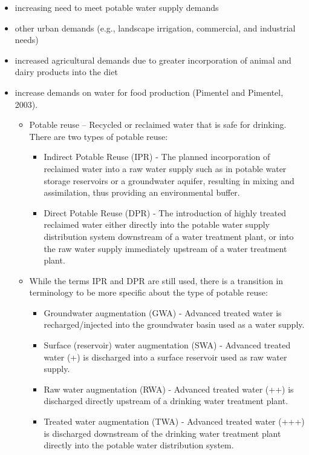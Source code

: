 \begin{itemize}
\item increasing need to meet potable water supply demands
\item other urban demands (e.g., landscape irrigation, commercial, and industrial needs)
\item increased agricultural demands due to greater incorporation of animal and dairy products into the diet
\item increase demands on water for food production (Pimentel and Pimentel, 2003). 
\begin{itemize}
\item Potable reuse – Recycled or reclaimed water that is safe for drinking.  There are two types of potable reuse:
\begin{itemize}
\item Indirect Potable Reuse (IPR) - The planned incorporation of reclaimed water into a raw water supply such as in potable water storage reservoirs or a groundwater aquifer, resulting in mixing and assimilation, thus providing an environmental buffer.
\item Direct Potable Reuse (DPR) - The introduction of highly treated reclaimed water either directly into the potable water supply distribution system downstream of a water treatment plant, or into the raw water supply immediately upstream of a water treatment plant.
\end{itemize}
\item While the terms IPR and DPR are still used, there is a transition in terminology to be more specific about the type of potable reuse:
\begin{itemize}
\item Groundwater augmentation (GWA) - Advanced treated water is recharged/injected into the groundwater basin used as a water supply.
\item Surface (reservoir) water augmentation (SWA) - Advanced treated water (+) is discharged into a surface reservoir used as raw water supply. 
\item Raw water augmentation (RWA) - Advanced treated water (++) is discharged directly upstream of a drinking water treatment plant.
\item Treated water augmentation (TWA) - Advanced treated water (+++) is discharged downstream of the drinking water treatment plant directly into the potable water distribution system.
\end{itemize}
\end{itemize}
\end{itemize}